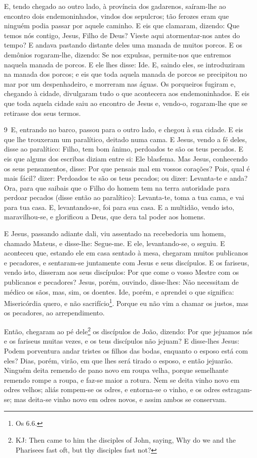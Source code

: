 E, tendo chegado ao outro lado, à província dos gadarenos,
saíram-lhe ao encontro dois endemoninhados, vindos dos sepulcros;
tão ferozes eram que ninguém podia passar por aquele caminho.
E eis que clamaram, dizendo: Que temos nós contigo, Jesus,
Filho de Deus? Vieste aqui atormentar-nos antes do tempo? E
andava pastando distante deles uma manada de muitos porcos. E
os demônios rogaram-lhe, dizendo: Se nos expulsas, permite-nos que
entremos naquela manada de porcos. E ele lhes disse: Ide. E,
saindo eles, se introduziram na manada dos porcos; e eis que toda
aquela manada de porcos se precipitou no mar por um despenhadeiro, e
morreram nas águas. Os porqueiros fugiram e, chegando à
cidade, divulgaram tudo o que acontecera aos endemoninhados.
E eis que toda aquela cidade saiu ao encontro de Jesus e,
vendo-o, rogaram-lhe que se retirasse dos seus termos.

\medskip

\lettrine{9}\ E, entrando no barco, passou para o outro lado, e
chegou à sua cidade. E eis que lhe trouxeram um paralítico, deitado
numa cama. E Jesus, vendo a fé deles, disse ao paralítico:
Filho, tem bom ânimo, perdoados te são os teus pecados. E eis
que alguns dos escribas diziam entre si: Ele blasfema. Mas
Jesus, conhecendo os seus pensamentos, disse: Por que pensais mal em
vossos corações? Pois, qual é mais fácil? dizer: Perdoados te
são os teus pecados; ou dizer: Levanta-te e anda? Ora, para que
saibais que o Filho do homem tem na terra autoridade para perdoar
pecados (disse então ao paralítico): Levanta-te, toma a tua cama, e
vai para tua casa. E, levantando-se, foi para sua casa. E a
multidão, vendo isto, maravilhou-se, e glorificou a Deus, que dera
tal poder aos homens.

E Jesus, passando adiante dali, viu assentado na recebedoria um
homem, chamado Mateus, e disse-lhe: Segue-me. E ele, levantando-se,
o seguiu. E aconteceu que, estando ele em casa sentado à
mesa, chegaram muitos publicanos e pecadores, e sen\-ta\-ram-se
juntamente com Jesus e seus discípulos. E os fariseus, vendo
isto, disseram aos seus discípulos: Por que come o vosso Mestre com
os publicanos e pecadores? Jesus, porém, ouvindo, disse-lhes:
Não necessitam de médico os sãos, mas, sim, os doentes. Ide,
porém, e aprendei o que significa: Misericórdia quero, e não
sacrifício\footnote{Os 6.6.}. Porque eu não vim a chamar os justos,
mas os pecadores, ao arrependimento.

Então, chegaram ao pé dele\footnote{KJ: Then came to him the
disciples of John, saying, Why do we and the Pharisees fast oft, but
thy disciples fast not?} os discípulos de João, dizendo: Por que
jejuamos nós e os fariseus muitas vezes, e os teus discípulos não
jejuam? E disse-lhes Jesus: Podem porventura andar tristes os
filhos das bodas, enquanto o esposo está com eles? Dias, porém,
virão, em que lhes será tirado o esposo, e então jejuarão.
Ninguém deita remendo de pano novo em roupa velha, porque
semelhante remendo rompe a roupa, e faz-se maior a rotura.
Nem se deita vinho novo em odres velhos; aliás rompem-se os
odres, e entorna-se o vinho, e os odres estragam-se; mas deita-se
vinho novo em odres novos, e assim ambos se conservam.


